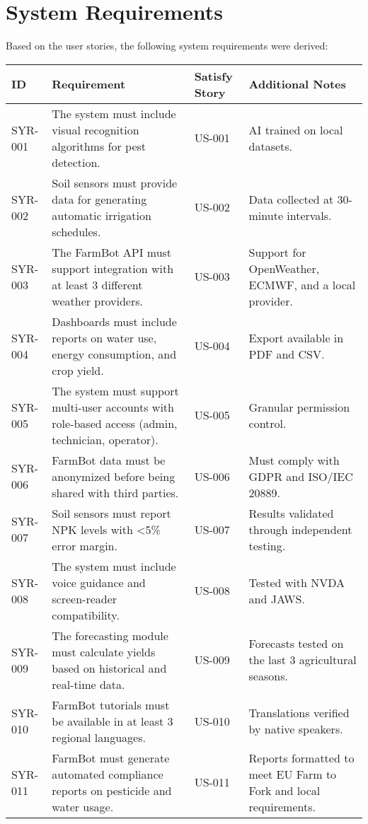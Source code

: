 \section{System Requirements}

Based on the user stories, the following system requirements were derived:

\begin{longtable}{|p{}|p{}|p{}|p{}|}
\hline
\textbf{ID} & \textbf{Requirement} & \textbf{Satisfy Story} & \textbf{Additional Notes} \\
\hline
\endhead
SYR-001 & The system must include visual recognition algorithms for pest detection. & US-001 & AI trained on local datasets. \\
\hline
SYR-002 & Soil sensors must provide data for generating automatic irrigation schedules. & US-002 & Data collected at 30-minute intervals. \\
\hline
SYR-003 & The FarmBot API must support integration with at least 3 different weather providers. & US-003 & Support for OpenWeather, ECMWF, and a local provider. \\
\hline
SYR-004 & Dashboards must include reports on water use, energy consumption, and crop yield. & US-004 & Export available in PDF and CSV. \\
\hline
SYR-005 & The system must support multi-user accounts with role-based access (admin, technician, operator). & US-005 & Granular permission control. \\
\hline
SYR-006 & FarmBot data must be anonymized before being shared with third parties. & US-006 & Must comply with GDPR and ISO/IEC 20889. \\
\hline
SYR-007 & Soil sensors must report NPK levels with <5\% error margin. & US-007 & Results validated through independent testing. \\
\hline
SYR-008 & The system must include voice guidance and screen-reader compatibility. & US-008 & Tested with NVDA and JAWS. \\
\hline
SYR-009 & The forecasting module must calculate yields based on historical and real-time data. & US-009 & Forecasts tested on the last 3 agricultural seasons. \\
\hline
SYR-010 & FarmBot tutorials must be available in at least 3 regional languages. & US-010 & Translations verified by native speakers. \\
\hline
SYR-011 & FarmBot must generate automated compliance reports on pesticide and water usage. & US-011 & Reports formatted to meet EU Farm to Fork and local requirements. \\
\hline
\end{longtable}

